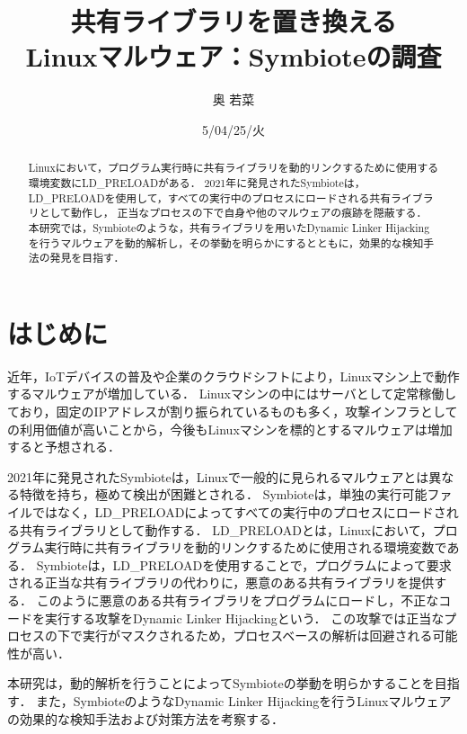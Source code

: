 \documentclass[submit,techreq,noauthor]{eco}	%
\begin{document}
\date   {5/04/25/火}				%
\title  {共有ライブラリを置き換える\\Linuxマルウェア：Symbioteの調査}	%
\author {奥 若菜}				%


\begin{abstract}
	Linuxにおいて，プログラム実行時に共有ライブラリを動的リンクするために使用する環境変数にLD\_PRELOADがある．
  2021年に発見されたSymbioteは，LD\_PRELOADを使用して，すべての実行中のプロセスにロードされる共有ライブラリとして動作し，
  正当なプロセスの下で自身や他のマルウェアの痕跡を隠蔽する．
  本研究では，Symbioteのような，共有ライブラリを用いたDynamic Linker Hijackingを行うマルウェアを動的解析し，その挙動を明らかにするとともに，効果的な検知手法の発見を目指す．
\end{abstract}
\maketitle


\section{はじめに}
近年，IoTデバイスの普及や企業のクラウドシフトにより，Linuxマシン上で動作するマルウェアが増加している\cite{TREND-MICRO}．
Linuxマシンの中にはサーバとして定常稼働しており，固定のIPアドレスが割り振られているものも多く，攻撃インフラとしての利用価値が高いことから，今後もLinuxマシンを標的とするマルウェアは増加すると予想される．

2021年に発見されたSymbioteは，Linuxで一般的に見られるマルウェアとは異なる特徴を持ち，極めて検出が困難とされる\cite{Symbiote}．
Symbioteは，単独の実行可能ファイルではなく，LD\_PRELOADによってすべての実行中のプロセスにロードされる共有ライブラリとして動作する．
LD\_PRELOADとは，Linuxにおいて，プログラム実行時に共有ライブラリを動的リンクするために使用される環境変数である．
Symbioteは，LD\_PRELOADを使用することで，プログラムによって要求される正当な共有ライブラリの代わりに，悪意のある共有ライブラリを提供する．
このように悪意のある共有ライブラリをプログラムにロードし，不正なコードを実行する攻撃をDynamic Linker Hijackingという\cite{MITRE-ATT&CK}．
この攻撃では正当なプロセスの下で実行がマスクされるため，プロセスベースの解析は回避される可能性が高い．

本研究は，動的解析を行うことによってSymbioteの挙動を明らかすることを目指す．
また，SymbioteのようなDynamic Linker Hijackingを行うLinuxマルウェアの効果的な検知手法および対策方法を考察する．
\end{document}
